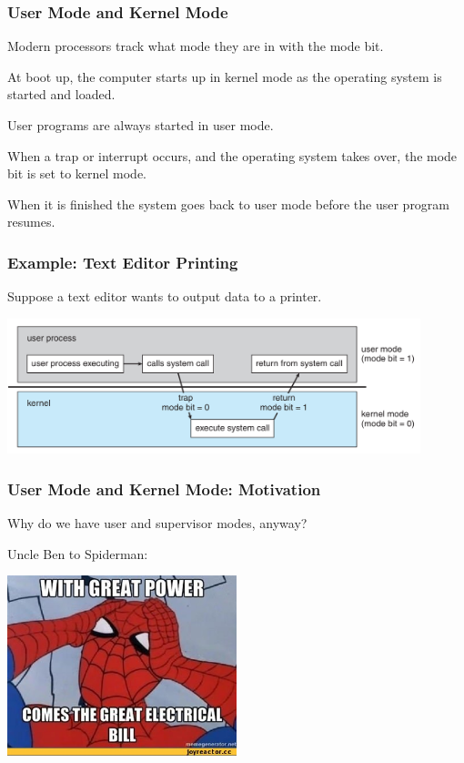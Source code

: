 \begin{frame}
	\frametitle{User Mode and Kernel Mode}

	Modern processors track what mode they are in with the mode bit.

	At boot up, the computer starts up in kernel mode as the operating system is started and loaded.

	User programs are always started in user mode.

	When a trap or interrupt occurs, and the operating system takes over, the mode bit is set to kernel mode.

	When it is finished the system goes back to user mode before the user program resumes.


\end{frame}


\begin{frame}
	\frametitle{Example: Text Editor Printing}

	Suppose a text editor wants to output data to a printer.

	\begin{center}
		\includegraphics[width=0.9\textwidth]{images/trap.png}
	\end{center}

\end{frame}

\begin{frame}
	\frametitle{User Mode and Kernel Mode: Motivation}

	Why do we have user and supervisor modes, anyway?

	Uncle Ben to Spiderman:
	\begin{center}
		\includegraphics[width=0.5\textwidth]{images/spiderman.jpg}
	\end{center}

\end{frame}

